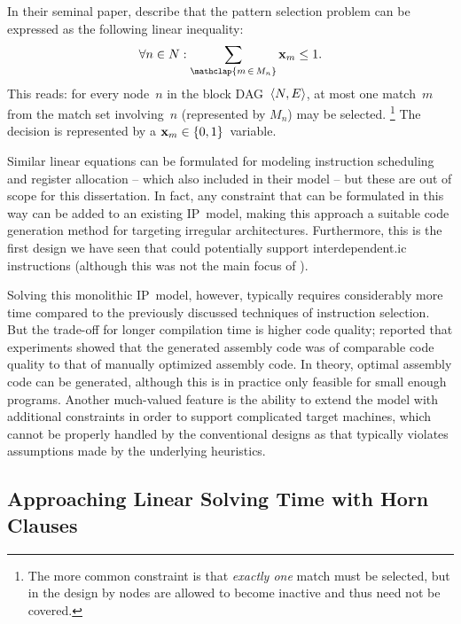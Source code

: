 In their seminal paper, \citeauthor{WilsonEtAl:1994} describe that the
\gls{pattern selection} problem can be expressed as the following linear
inequality:
%
\begin{displaymath}
  \forall n \in N : \sum_{\mathclap{m \,\in\, M_n}} \mVar{x}_m \leq 1.
\end{displaymath}
%
This reads: for every \gls{node}~$n$ in the \gls{block DAG}~\mbox{$\mTuple{N,
    E}$}, at most one \gls{match}~$m$ from the \gls{match set} involving~$n$
(represented by $M_n$) may be selected.\!%
%
\footnote{%
  The more common \gls{constraint} is that \emph{exactly one} \gls{match} must
  be selected, but in the design by \citeauthor{WilsonEtAl:1994} \glspl{node}
  are allowed to become inactive and thus need not be covered.%
}
%
The decision is represented by a $\mVar{x}_m \in \mSet{0, 1}$~\gls{variable}.

Similar linear equations can be formulated for modeling \gls{instruction
  scheduling} and \gls{register allocation} -- which
\citeauthor{WilsonEtAl:1994} also included in their model -- but these are out
of scope for this dissertation.
%
In fact, any \gls{constraint} that can be formulated in this way can be added to
an existing \gls{IP}~model, making this approach a suitable \gls{code
  generation} method for targeting irregular architectures.
%
Furthermore, this is the first design we have seen that could potentially
support \gls{interdependent.ic} \glspl{instruction} (although this was not the
main focus of \citeauthor{WilsonEtAl:1994}).

Solving this monolithic \gls{IP}~model, however, typically requires considerably
more time compared to the previously discussed techniques of \gls{instruction
  selection}.
%
But the trade-off for longer compilation time is higher code quality;
\citeauthor{WilsonEtAl:1994} reported that experiments showed that the generated
\gls{assembly code} was of comparable code quality to that of manually optimized
\gls{assembly code}.
%
In theory, optimal \gls{assembly code} can be generated, although this is in
practice only feasible for small enough \glspl{program}.
%
Another much-valued feature is the ability to extend the model with additional
\glspl{constraint} in order to support complicated \glspl{target machine}, which
cannot be properly handled by the conventional designs as that typically
violates assumptions made by the underlying heuristics.


\subsection{Approaching Linear Solving Time with Horn Clauses}

